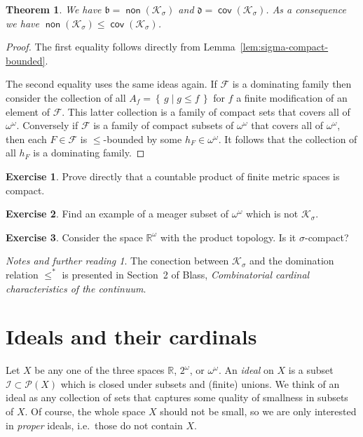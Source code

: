 \documentclass[11pt,oneside]{amsbook}
\newcommand{\set}[1]{\left\{\,#1\,\right\}}
\newcommand{\R}{\mathbb R}
\newcommand{\Ksigma}{\mathcal K_\sigma}
\DeclareMathOperator{\non}{\mathsf{non}}
\DeclareMathOperator{\cov}{\mathsf{cov}}
\theoremstyle{definition}
\newtheorem{exerc}{Exercise}[section]
\theoremstyle{plain}
\newtheorem{theorem}{Theorem}[section]
\theoremstyle{definition}
\theoremstyle{remark}
\newtheorem*{notes}{Notes and further reading}
\numberwithin{equation}{section}
\numberwithin{figure}{section}
\begin{document}
\begin{theorem}
  \label{thm:bd-vs-ksigma}
  We have $\mathfrak b=\non(\Ksigma)$ and $\mathfrak d=\cov(\Ksigma)$. As a consequence we have $\non(\Ksigma)\leq\cov(\Ksigma)$.
\end{theorem}

\begin{proof}
  The first equality follows directly from Lemma~\ref{lem:sigma-compact-bounded}.

  The second equality uses the same ideas again. If $\mathcal F$ is a dominating family then consider the collection of all $A_f=\set{g\mid g\leq f}$ for $f$ a finite modification of an element of $\mathcal F$. This latter collection is a family of compact sets that covers all of $\omega^\omega$. Conversely if $\mathcal F$ is a family of compact subsets of $\omega^\omega$ that covers all of $\omega^\omega$, then each $F\in\mathcal F$ is $\leq$-bounded by some $h_F\in\omega^\omega$. It follows that the collection of all $h_F$ is a dominating family.
\end{proof}

\begin{exerc}
  Prove directly that a countable product of finite metric spaces is compact.
\end{exerc}

\begin{exerc}
  Find an example of a meager subset of $\omega^\omega$ which is not $\Ksigma$.
\end{exerc}

\begin{exerc}
  Consider the space $\R^\omega$ with the product topology. Is it $\sigma$-compact?
\end{exerc}

\begin{notes}
  The conection between $\mathcal K_\sigma$ and the domination relation $\leq^*$ is presented in Section~2 of Blass, \emph{Combinatorial cardinal characteristics of the continuum}.
\end{notes}


\newpage
\section{Ideals and their cardinals}

Let $X$ be any one of the three spaces $\R$, $2^\omega$, or $\omega^\omega$. An \emph{ideal} on $X$ is a subset $\mathcal I\subset\mathcal P(X)$ which is closed under subsets and (finite) unions. We think of an ideal as any collection of sets that captures some quality of smallness in subsets of $X$. Of course, the whole space $X$ should not be small, so we are only interested in \emph{proper} ideals, i.e.\ those do not contain $X$.
\end{document}
